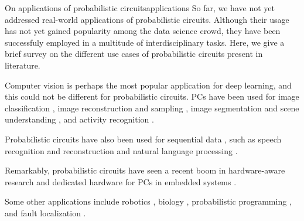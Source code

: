 \begin{remark}[breakable]{On applications of probabilistic circuits}{applications}
  So far, we have not yet addressed real-world applications of probabilistic circuits. Although
  their usage has not yet gained popularity among the data science crowd, they have been
  successfuly employed in a multitude of interdisciplinary tasks. Here, we give a brief survey on
  the different use cases of probabilistic circuits present in literature.

  Computer vision is perhaps the most popular application for deep learning, and this could not be
  different for probabilistic circuits. PCs have been used for image classification
  \citep{gens12,sguerra16,llerena17,geh19,peharz20a}, image reconstruction and sampling
  \citep{poon11,dennis17,peharz20b,butz19}, image segmentation and scene understanding
  \citep{friesen17,yuan16,friesen18,rathke17}, and activity recognition
  \citep{wang18,amer12,nourani20,amer16}.

  Probabilistic circuits have also been used for sequential data \citep{melibari16b}, such as
  speech recognition and reconstruction \citep{peharz14b,ratajczak14,ratajczak18} and natural
  language processing \citep{cheng14}.

  Remarkably, probabilistic circuits have seen a recent boom in hardware-aware research
  \citep{shah19,olascoaga19} and dedicated hardware for PCs in embedded systems
  \citep{sommer18,shah20,shah21}.

  Some other applications include robotics \citep{sguerra16,geh19,zheng18,pronobis17}, biology
  \citep{butz18,friesen15}, probabilistic programming \citep{stuhlmuller12,saad21}, and fault
  localization \citep{nath16}.
\end{remark}

